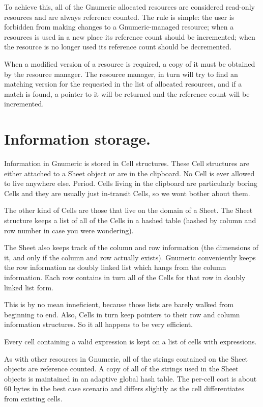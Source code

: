 \documentclass[12pt,twoside,twocolumn]{article}
\begin{document}
To achieve this, all of the Gnumeric allocated resources are
considered read-only resources and are always reference counted.  The
rule is simple: the user is forbidden from making changes to a
Gnumeric-managed resource;  when a resources is used in a new place
its reference count should be incremented;  when the resource is no
longer used its reference count should be decremented. 

When a modified version of a resource is required, a copy of it must
be obtained by the resource manager.  The resource manager, in turn
will try to find an matching version for the requested in the list of
allocated resources, and if a match is found, a pointer to it will be
returned and the reference count will be incremented.


\section{Information storage.}

Information in Gnumeric is stored in Cell structures.  These Cell
structures are either attached to a Sheet object or are in the
clipboard.  No Cell is ever allowed to live anywhere else.  Period.
Cells living in the clipboard are particularly boring Cells and they
are usually just in-transit Cells, so we wont bother about them.

The other kind of Cells are those that live on the domain of a Sheet.
The Sheet structure keeps a list of all of the Cells in a hashed table
(hashed by column and row number in case you were wondering).  

The Sheet also keeps track of the column and row information (the
dimensions of it, and only if the column and row actually exists).
Gnumeric conveniently keeps the row information as doubly linked list
which hangs from the column information.  Each row contains in turn
all of the Cells for that row in doubly linked list form.

This is by no mean inneficient, because those lists are barely walked
from beginning to end.  Also, Cells in turn keep pointers to their
row and column information structures.  So it all happens to be very
efficient. 

Every cell containing a valid expression is kept on a list of
cells with expressions. 

As with other resources in Gnumeric, all of the strings contained on
the Sheet objects are reference counted.  A copy of all of the strings
used in the Sheet objects is maintained in an adaptive global hash
table.  The per-cell cost is about 60 bytes in the best case scenario
and differs slightly as the cell differentiates from existing cells.
\end{document}
